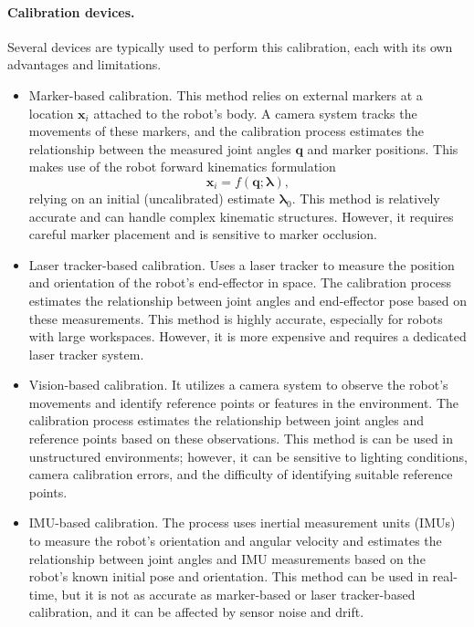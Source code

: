 \paragraph*{Calibration devices.} Several devices are typically used to perform this calibration, each with its own advantages and limitations. \TODO~
\begin{itemize}
	\item Marker-based calibration.  This method relies on external markers at a location $\bm{x}_i$ attached to the robot's body. A camera system tracks the movements of these markers, and the calibration process estimates the relationship between the measured joint angles $\bm{q}$ and marker positions. This makes use of the robot forward kinematics formulation
	\begin{equation}
		\bm{x}_i = f\left(\bm{q};\bm{\lambda}\right),
	\end{equation}
	relying on an initial (uncalibrated) estimate $\bm{\lambda}_0$. This method is relatively accurate and can handle complex kinematic structures. However, it requires careful marker placement and is sensitive to marker occlusion.
	\item Laser tracker-based calibration. Uses a laser tracker to measure the position and orientation of the robot's end-effector in space. The calibration process estimates the relationship between joint angles and end-effector pose based on these measurements. This method is highly accurate, especially for robots with large workspaces. However, it is more expensive and requires a dedicated laser tracker system.
	\item Vision-based calibration. It utilizes a camera system to observe the robot's movements and identify reference points or features in the environment. The calibration process estimates the relationship between joint angles and reference points based on these observations. This method is can be used in unstructured environments; however, it can be sensitive to lighting conditions, camera calibration errors, and the difficulty of identifying suitable reference points.
	\item IMU-based calibration. The process uses inertial measurement units (IMUs) to measure the robot's orientation and angular velocity and estimates the relationship between joint angles and IMU measurements based on the robot's known initial pose and orientation. This method can be used in real-time, but it is not as accurate as marker-based or laser tracker-based calibration, and it can be affected by sensor noise and drift.	
\end{itemize}
